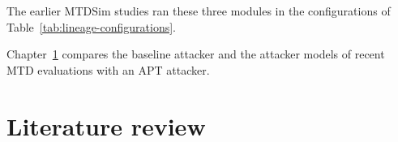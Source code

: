 \documentclass{cshonours}
\begin{document}
The earlier MTDSim studies ran these three modules in the configurations
of Table~\ref{tab:lineage-configurations}.



Chapter~\ref{ch:litreview} compares the baseline attacker and the attacker
models of recent MTD evaluations with an APT attacker.


\chapter{Literature review}
\label{ch:litreview}
\end{document}
